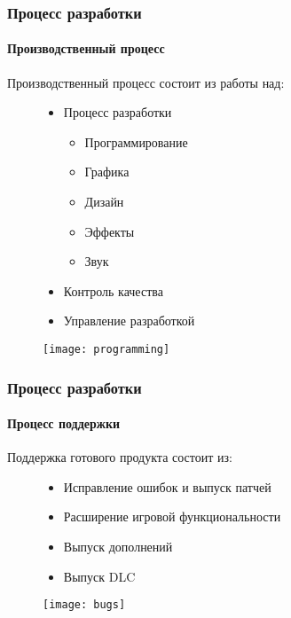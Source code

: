 \begin{frame}
    \frametitle{Процесс разработки}
    \framesubtitle{Производственный процесс}
    Производственный процесс состоит из работы над:
    \begin{figure}
        \begin{minipage}{0.47\textwidth}
            \begin{itemize}
                \item Процесс разработки
                \begin{itemize}
                    \item Программирование
                    \item Графика
                    \item Дизайн
                    \item Эффекты
                    \item Звук
                \end{itemize}
                \item Контроль качества
                \item Управление разработкой
            \end{itemize}
        \end{minipage}
        \begin{minipage}{0.5\textwidth}
            \texttt{[image: programming]}
        \end{minipage}
    \end{figure}
\end{frame}

\begin{frame}
    \frametitle{Процесс разработки}
    \framesubtitle{Процесс поддержки}
    Поддержка готового продукта состоит из:
    \begin{figure}
        \begin{minipage}{0.47\textwidth}
            \begin{itemize}
                \item Исправление ошибок и выпуск патчей
                \item Расширение игровой функциональности
                \item Выпуск дополнений
                \item Выпуск DLC
            \end{itemize}
        \end{minipage}
        \begin{minipage}{0.5\textwidth}
            \texttt{[image: bugs]}
        \end{minipage}
    \end{figure}
\end{frame}

